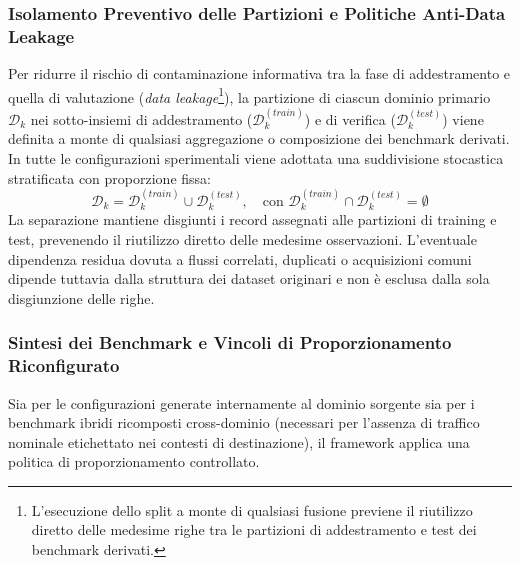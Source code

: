 \subsubsection{Isolamento Preventivo delle Partizioni e Politiche Anti-Data Leakage}
\label{subsubsec:isolamento_partizioni}
Per ridurre il rischio di contaminazione informativa tra la fase di addestramento e quella di valutazione (\textit{data leakage}\footnote{L'esecuzione dello split a monte di qualsiasi fusione previene il riutilizzo diretto delle medesime righe tra le partizioni di addestramento e test dei benchmark derivati.}), la partizione di ciascun dominio primario $\mathcal{D}_k$ nei sotto-insiemi di addestramento ($\mathcal{D}_k^{(train)}$) e di verifica ($\mathcal{D}_k^{(test)}$) viene definita a monte di qualsiasi aggregazione o composizione dei benchmark derivati. In tutte le configurazioni sperimentali viene adottata una suddivisione stocastica stratificata con proporzione fissa:
\begin{equation}
    \mathcal{D}_k = \mathcal{D}_k^{(train)} \cup \mathcal{D}_k^{(test)}, \quad \text{con } \mathcal{D}_k^{(train)} \cap \mathcal{D}_k^{(test)} = \emptyset
    \label{eq:split_train_test}
\end{equation}
La separazione mantiene disgiunti i record assegnati alle partizioni di training e test, prevenendo il riutilizzo diretto delle medesime osservazioni. L'eventuale dipendenza residua dovuta a flussi correlati, duplicati o acquisizioni comuni dipende tuttavia dalla struttura dei dataset originari e non è esclusa dalla sola disgiunzione delle righe.

\subsubsection{Sintesi dei Benchmark e Vincoli di Proporzionamento Riconfigurato}
\label{subsubsec:sintesi_benchmark}
Sia per le configurazioni generate internamente al dominio sorgente sia per i benchmark ibridi ricomposti cross-dominio (necessari per l'assenza di traffico nominale etichettato nei contesti di destinazione), il framework applica una politica di proporzionamento controllato.

